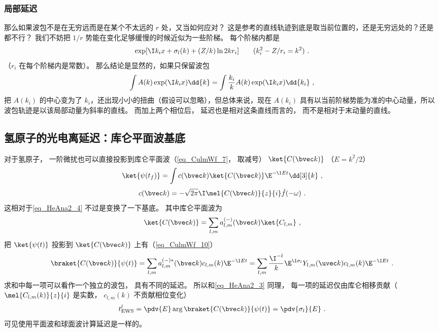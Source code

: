 \subsubsection{局部延迟}
那么如果波包不是在无穷远而是在某个不太远的 $r$ 处，又当如何应对？ 这是参考的直线轨迹到底是取当前位置的，还是无穷远处的？还是都不行？ 我们不妨把 $1/r$ 势能在变化足够缓慢的时候近似为一些阶梯。 每个阶梯内都是
\begin{equation}
\exp[\I k_i x + \sigma_l(k) + (Z/k) \ln 2kr_i]\qquad (k_i^2 - Z/r_i = k^2)~.
\end{equation}
（$r_i$ 在每个阶梯内是常数）。 那么结论是显然的，如果只保留波包
\begin{equation}
\int A(k) \exp(\I k_i x) \dd{k} = \int \frac{k_i}{k}A(k)\exp(\I k_i x) \dd{k_i} ~,
\end{equation}
把 $A(k_i)$ 的中心变为了 $k_i$，还出现小小的扭曲（假设可以忽略），但总体来说，现在 $A(k_i)$ 具有以当前阶梯势能为准的中心动量，所以波包轨迹是以该局部动量为斜率的直线。 而加上两个相位后， 延迟也是相对这条直线而言的， 而不是相对于末动量的直线。


\subsection{氢原子的光电离延迟：库仑平面波基底} \label{sub_HeAna2_2}
对于氢原子， 一阶微扰也可以直接投影到库仑平面波（\autoref{eq_CulmWf_7}， 取减号） $\ket{C(\bvec k)}$ （$E = k^2/2$）
\begin{equation}
\ket{\psi(t_f)} = \int c(\bvec k)\ket{C(\bvec k)} \E^{-\I E t} \dd[3]{k}~,
\end{equation}
\begin{equation}
c(\bvec k) = -\sqrt{2\pi}\I\mel{C(\bvec k)}{z}{i} \tilde f(-\omega)~.
\end{equation}
这相对于\autoref{eq_HeAna2_4} 不过是变换了一下基底。 其中库仑平面波为
\begin{equation}
\ket{C(\bvec k)} = \sum_{l,m} a_{l,m}^{(-)}(\bvec k) \ket{C_{l,m}}~,
\end{equation}
把 $\ket{\psi(t)}$ 投影到 $\ket{C(\bvec k)}$ 上有（\autoref{eq_CulmWf_10}）
\begin{equation}
\braket{C(\bvec k)}{\psi(t)} = \sum_{l,m} a_{l,m}^{(-)*}(\bvec k) c_{l,m}(k) \E^{-\I E t} 
= \sum_{l,m} \frac{\I^{-l}}{k} \E^{\I\sigma_l} Y_{l,m} (\uvec k) c_{l,m}(k) \E^{-\I E t}~.
\end{equation}
求和中每一项可以看作一个独立的波包， 具有不同的延迟。 所以和\autoref{eq_HeAna2_3} 同理， 每一项的延迟仅由库仑相移贡献（$\mel{C_{l,m}(k)}{z}{i}$ 是实数， $c_{l,m}(k)$ 不贡献相位变化）
\begin{equation}\label{eq_HeAna2_6}
t_\text{EWS}^l = \pdv{E} \arg\braket{C(\bvec k)}{\psi(t)} = \pdv{\sigma_l}{E}~.
\end{equation}
可见使用平面波和球面波计算延迟是一样的。

